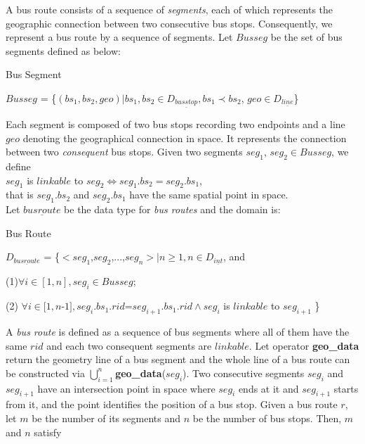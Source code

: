 A bus route consists of a sequence of \textit{segments}, each of which represents the geographic 
connection between two consecutive bus stops. Consequently, we represent a bus route 
by a sequence of segments. Let $Busseg$ be the set of bus segments defined as below:  

\begin{Statement}
\label{defintionseg}
 Bus Segment 

$Busseg$ = 
\{$(bs_1,bs_2,geo)|bs_1,bs_2 \in D_{\underline{busstop}},bs_1 \prec bs_2$, 
$geo \in D_{\underline{line}}$\}
\end{Statement}

Each segment is composed of two bus stops recording two endpoints and a line $geo$ denoting 
the geographical connection in space. It represents the connection between 
two \textit{consequent} bus stops. Given two segments $seg_1$, $seg_2 \in Busseg$, we define\\

$seg_1$ is $linkable$ to $seg_2\Leftrightarrow seg_1.bs_2=seg_2.bs_1$, \\

that is $seg_1.bs_2$ and $seg_2.bs_1$ have the same spatial point in space. \\

Let $\underline{busroute}$ be the data type for \textit{bus routes} and the domain is: 

\begin{Statement}
\label{defintionbusroute}
 Bus Route 

$D_{\underline{busroute}}$ = 
\{$<seg_1$,$seg_2$,...,$seg_n> | n\geq1, n \in D_{\underline{int}}$, and 

(1)$\forall i \in [1,n], seg_i \in Busseg$;

(2) $\forall i \in[1,n$-$1], seg_i.bs_1.rid$=$seg_{i+1}.bs_1.rid 
\wedge seg_i$ is $linkable$ to $seg_{i+1}$ \}
\end{Statement}

A \textit{bus route} is defined as a sequence of bus segments where 
all of them have the same $rid$ and each two consequent segments are $linkable$. 
Let operator \textbf{geo\_data} return the geometry line of a bus
segment and the whole line of a bus route can be constructed via
$\bigcup_{i=1}^{n}$\textbf{geo\_data}($seg_i$). Two consecutive segments
$seg_i$ and $seg_{i+1}$ have an intersection point in space where $seg_i$ ends at it and 
$seg_{i+1}$ starts from it, and the point identifies the position of a 
bus stop. Given a bus route $r$, let $m$ be the number of its segments and $n$ be the 
number of bus stops. Then, $m$ and $n$ satisfy

